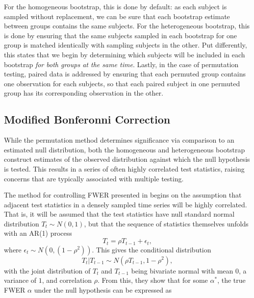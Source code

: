 For the homogeneous bootstrap, this is done by default: as each subject is sampled without replacement, we can be sure that each bootstrap estimate between groups contains the same subjects. For the heterogeneous bootstrap, this is done by ensuring that the same subjects sampled in each bootstrap for one group is matched identically with sampling subjects in the other. Put differently, this states that we begin by determining which subjects will be included in each bootstrap \textit{for both groups at the same time}. Lastly, in the case of permutation testing, paired data is addressed by ensuring that each permuted group contains one observation for each subjects, so that each paired subject in one permuted group has its corresponding observation in the other. 

\subsection{Modified Bonferonni Correction}

While the permutation method determines significance via comparison to an estimated null distribution, both the homogeneous and heterogeneous bootstrap construct estimates of the observed distribution against which the null hypothesis is tested. This results in a series of often highly correlated test statistics, raising concerns that are typically associated with multiple testing. 

The method for controlling FWER presented in \citet{oleson2017detecting} begins on the assumption that adjacent test statistics in a densely sampled time series will be highly correlated. That is, it will be assumed that the test statistics have null standard normal distribution $T_t \sim N(0,1)$, but that the sequence of statistics themselves unfolds with an AR(1) process
\begin{equation}
T_t = \rho  T_{t-1} + \epsilon_t,
\end{equation}
where $\epsilon_t \sim N(0, (1 - \rho^2))$. This gives the conditional distribution
\begin{equation}
T_t | T_{t-1} \sim N(\rho T_{t-1}, 1 - \rho^2),
\end{equation}
with the joint distribution of $T_t$ and $T_{t-1}$ being bivariate normal with mean $0$, a variance of $1$, and correlation $\rho$. From this, they show that for some $\alpha^*$, the true FWER $\alpha$ under the null hypothesis can be expressed as 

